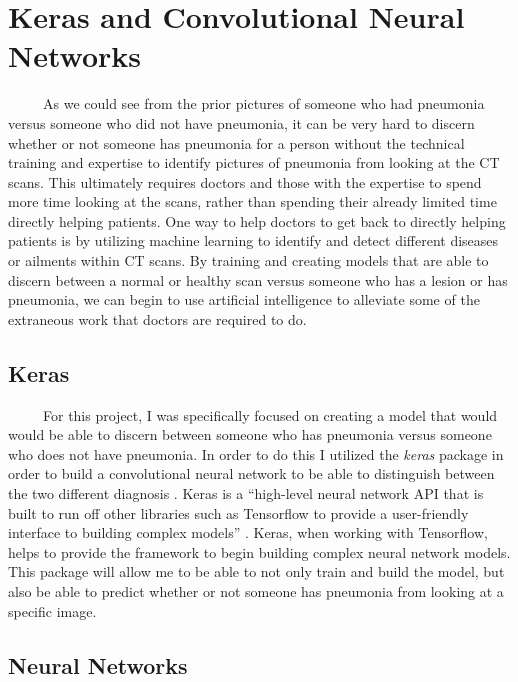 \documentclass[12pt]{article}
\begin{document}
\hypertarget{keras-and-convolutional-neural-networks}{%
\section{Keras and Convolutional Neural
Networks}\label{keras-and-convolutional-neural-networks}}

~~~~~As we could see from the prior pictures of someone who had
pneumonia versus someone who did not have pneumonia, it can be very hard
to discern whether or not someone has pneumonia for a person without the
technical training and expertise to identify pictures of pneumonia from
looking at the CT scans. This ultimately requires doctors and those with
the expertise to spend more time looking at the scans, rather than
spending their already limited time directly helping patients. One way
to help doctors to get back to directly helping patients is by utilizing
machine learning to identify and detect different diseases or ailments
within CT scans. By training and creating models that are able to
discern between a normal or healthy scan versus someone who has a lesion
or has pneumonia, we can begin to use artificial intelligence to
alleviate some of the extraneous work that doctors are required to do.

\hypertarget{keras}{%
\subsection{Keras}\label{keras}}

~~~~~For this project, I was specifically focused on creating a model
that would would be able to discern between someone who has pneumonia
versus someone who does not have pneumonia. In order to do this I
utilized the \emph{keras} package in order to build a convolutional
neural network to be able to distinguish between the two different
diagnosis \citep{Keras2}. Keras is a ``high-level neural network API
that is built to run off other libraries such as Tensorflow to provide a
user-friendly interface to building complex models'' \citep{PML}. Keras,
when working with Tensorflow, helps to provide the framework to begin
building complex neural network models. This package will allow me to be
able to not only train and build the model, but also be able to predict
whether or not someone has pneumonia from looking at a specific image.

\hypertarget{neural-networks}{%
\subsection{Neural Networks}\label{neural-networks}}
\end{document}
